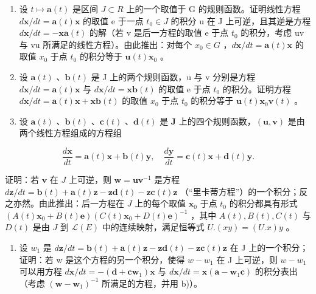 \begin{enumerate}
\def\labelenumi{\alph{enumi})}
\item
  设 \(t \mapsto \mathbf{a}(t)\) 是区间 \(J \subset R\) 上的一个取值于 G 的规则函数。证明线性方程 \(d\mathbf{x}/dt = \mathbf{a}(t)\mathbf{x}\) 的取值 e 于一点 \(t_0 \in J\) 的积分 u 在 J 上可逆，且其逆是方程 \(d\mathbf{x}/dt = -\mathbf{x}\mathbf{a}(t)\) 的解（若 v 是后一方程的取值 e 于点 \(t_0\) 的积分，考虑 uv 与 vu 所满足的线性方程）。由此推出：对每个 \(x_0 \in G\) ，\(d\mathbf{x}/dt = \mathbf{a}(t)\mathbf{x}\) 的取值 \(x_0\) 于点 \(t_0\) 的积分等于 \(\mathbf{u}(t)\mathbf{x}_0\) 。
\item
  设 \(\mathbf{a}(t)\) 、\(\mathbf{b}(t)\) 是 J 上的两个规则函数，u 与 v 分别是方程 \(d\mathbf{x}/dt = \mathbf{a}(t)\mathbf{x}\) 与 \(d\mathbf{x}/dt = \mathbf{x}\mathbf{b}(t)\) 的取值 e 于点 \(t_{0}\) 的积分。证明方程 \(d\mathbf{x}/dt = \mathbf{a}(t)\mathbf{x} + \mathbf{x}\mathbf{b}(t)\) 的取值 \(x_{0}\) 于点 \(t_{0}\) 的积分等于 \(\mathbf{u}(t)\mathbf{x}_{0}\mathbf{v}(t)\) 。
\item
  设 \(\mathbf{a}(t)\) 、\(\mathbf{b}(t)\) 、\(\mathbf{c}(t)\) 、\(\mathbf{d}(t)\) 是 \(\mathbf{J}\) 上的四个规则函数，\((\mathbf{u}, \mathbf{v})\) 是由两个线性方程组成的方程组
\end{enumerate}

\[
\frac {d \mathbf {x}}{d t} = \mathbf {a} (t) \mathbf {x} + \mathbf {b} (t) \mathbf {y}, \quad \frac {d \mathbf {y}}{d t} = \mathbf {c} (t) \mathbf {x} + \mathbf {d} (t) \mathbf {y}.
\]

证明：若 \(\mathbf{v}\) 在 \(J\) 上可逆，则 \(\mathbf{w} = \mathbf{u}\mathbf{v}^{-1}\) 是方程 \(d\mathbf{z}/dt = \mathbf{b}(t) + \mathbf{a}(t)\mathbf{z} - \mathbf{z}\mathbf{d}(t) - \mathbf{z}\mathbf{c}(t)\mathbf{z}\) （“里卡蒂方程”）的一个积分；反之亦然。由此推出：后一方程在 \(J\) 上的每个取值 \(\mathbf{x}_0\) 于点 \(t_0\) 的积分都具有形式 \((A(t)\mathbf{x}_0 + B(t)\mathbf{e})(C(t)\mathbf{x}_0 + D(t)\mathbf{e})^{-1}\) ，其中 \(A(t), B(t), C(t)\) 与 \(D(t)\) 是由 \(J\) 到 \(\mathcal{L}(E)\) 中的连续映射，满足恒等式 \(U.(xy) = (U.x)y\) 。

\begin{enumerate}
\def\labelenumi{\alph{enumi})}
\setcounter{enumi}{3}
\tightlist
\item
  设 \(w_{1}\) 是 \(d\mathbf{z}/dt = \mathbf{b}(t) + \mathbf{a}(t)\mathbf{z} - \mathbf{z}\mathbf{d}(t) - \mathbf{z}\mathbf{c}(t)\mathbf{z}\) 在 J 上的一个积分；证明：若 w 是这个方程的另一个积分，使得 \(w - w_{1}\) 在 J 上可逆，则 \(w - w_{1}\) 可以用方程 \(d\mathbf{x}/dt = -(\mathbf{d} + \mathbf{c}\mathbf{w}_{1})\mathbf{x}\) 与 \(d\mathbf{x}/dt = \mathbf{x}(\mathbf{a} - \mathbf{w}_{1}\mathbf{c})\) 的积分表出（考虑 \((\mathbf{w} - \mathbf{w}_{1})^{-1}\) 所满足的方程，并用 b)）。
\end{enumerate}

